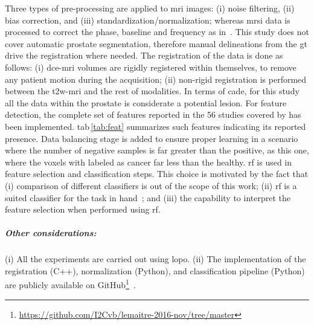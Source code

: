 \documentclass[a4paper,num-refs]{wiley-article}
\begin{document}
Three types of pre-processing are applied to \ac{mri} images: (i) noise filtering,
(ii) bias correction, and (iii) standardization/normalization; whereas
\ac{mrsi} data is processed to correct the phase, baseline and frequency
as in \citeauthor{Chen2002}\,\cite{Chen2002}.
%
This study does not cover automatic prostate segmentation, therefore manual
delineations from the \ac{gt} drive the registration where needed.
The registration of the data is done as follows: (i) \ac{dce}-\ac{mri} volumes
are rigidly registered within themselves, to remove any patient motion during
the acquisition; (ii) non-rigid registration is performed between the
\ac{t2w}-\ac{mri} and the rest of modalities.
%
In terms of \ac{cade}, for this study all the data within the prostate is
considerate a potential lesion.
%
For feature detection, the complete set of features reported in the 56 studies
covered by \cite{lemaitre2015computer} has been implemented.
\Ac{tab}\,\ref{tab:feat} summarizes such features indicating its reported presence.
%
Data balancing stage is added to ensure proper learning in a scenario where the
number of negative samples is far greater than the positive, as this one, where
the voxels with labeled as cancer far less than the healthy. 
%
\ac{rf} is used in feature selection and classification steps. This choice is
motivated by the fact that
(i) comparison of different classifiers is out of the
scope of this work;
(ii) \ac{rf} is a suited classifier for the task in
hand~\cite{lemaitre2015computer};
and (iii) the capability to interpret the feature selection when performed using \ac{rf}.


\subparagraph{Other considerations:}
(i) All the experiments are carried out using \ac{lopo}.
(ii) The implementation of the registration (C++), normalization (Python), and
classification pipeline (Python) are publicly available on
GitHub\footnote{\url{https://github.com/I2Cvb/lemaitre-2016-nov/tree/master}}~\citep{lemaitre2016github}.
\end{document}

